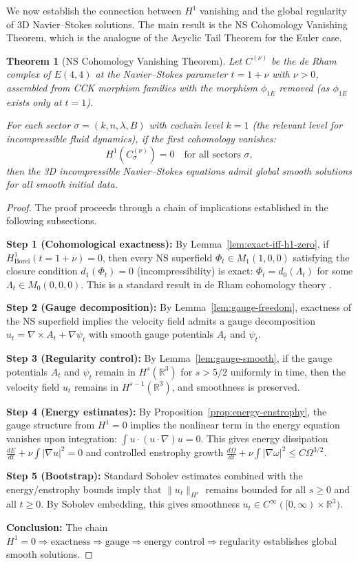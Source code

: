 \documentclass[reqno,10pt]{amsart}
\theoremstyle{plain}
\newtheorem{theorem}{Theorem}[section]
\theoremstyle{definition}
\begin{document}
We now establish the connection between $H^1$ vanishing and the global regularity of 3D Navier--Stokes solutions. The main result is the NS Cohomology Vanishing Theorem, which is the analogue of the Acyclic Tail Theorem for the Euler case.

\begin{theorem}[NS Cohomology Vanishing Theorem]\label{thm:ns-h1-vanishing}
Let $C^{(\nu)}$ be the de Rham complex of $E(4,4)$ at the Navier--Stokes parameter $t=1+\nu$ with $\nu>0$, assembled from CCK morphism families with the morphism $\phi_{1E}$ removed (as $\phi_{1E}$ exists only at $t=1$).

For each sector $\sigma = (k, n, \lambda, B)$ with cochain level $k=1$ (the relevant level for incompressible fluid dynamics), if the first cohomology vanishes:
\[
  H^1(C^{(\nu)}_\sigma) = 0 \quad \text{for all sectors } \sigma,
\]
then the 3D incompressible Navier--Stokes equations admit global smooth solutions for all smooth initial data.
\end{theorem}

\begin{proof}
The proof proceeds through a chain of implications established in the following subsections.

\textbf{Step 1 (Cohomological exactness):} 
By Lemma~\ref{lem:exact-iff-h1-zero}, if $H^1_{\text{Borel}}(t=1+\nu)=0$, then every NS superfield $\Phi_t \in M_1(1,0,0)$ satisfying the closure condition $d_1(\Phi_t)=0$ (incompressibility) is exact: $\Phi_t = d_0(\Lambda_t)$ for some $\Lambda_t \in M_0(0,0,0)$. This is a standard result in de Rham cohomology theory \cite{deRham1955}.

\textbf{Step 2 (Gauge decomposition):}
By Lemma~\ref{lem:gauge-freedom}, exactness of the NS superfield implies the velocity field admits a gauge decomposition $u_t = \nabla\times A_t + \nabla\psi_t$ with smooth gauge potentials $A_t$ and $\psi_t$.

\textbf{Step 3 (Regularity control):}
By Lemma~\ref{lem:gauge-smooth}, if the gauge potentials $A_t$ and $\psi_t$ remain in $H^s(\mathbb{R}^3)$ for $s>5/2$ uniformly in time, then the velocity field $u_t$ remains in $H^{s-1}(\mathbb{R}^3)$, and smoothness is preserved.

\textbf{Step 4 (Energy estimates):}
By Proposition~\ref{prop:energy-enstrophy}, the gauge structure from $H^1=0$ implies the nonlinear term in the energy equation vanishes upon integration: $\int u\cdot(u\cdot\nabla)u = 0$. This gives energy dissipation $\frac{dE}{dt} + \nu\int|\nabla u|^2 = 0$ and controlled enstrophy growth $\frac{d\Omega}{dt} + \nu\int|\nabla\omega|^2 \le C\Omega^{3/2}$.

\textbf{Step 5 (Bootstrap):}
Standard Sobolev estimates \cite{Adams1975} combined with the energy/enstrophy bounds imply that $\|u_t\|_{H^s}$ remains bounded for all $s\ge 0$ and all $t\ge 0$. By Sobolev embedding, this gives smoothness $u_t \in C^\infty([0,\infty)\times\mathbb{R}^3)$.

\textbf{Conclusion:}
The chain $H^1=0 \Rightarrow \text{exactness} \Rightarrow \text{gauge} \Rightarrow \text{energy control} \Rightarrow \text{regularity}$ establishes global smooth solutions.  
\end{proof}
\end{document}
